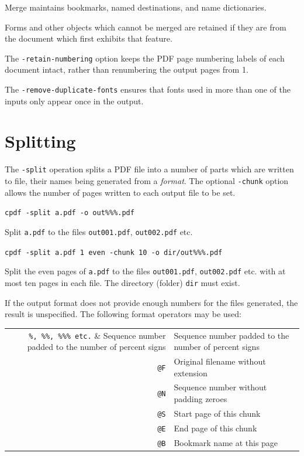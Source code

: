 \documentclass[a4paper,makeidx]{memoir}
\begin{document}
\noindent Merge maintains bookmarks, named destinations, and name dictionaries.

Forms and other objects which cannot be merged are retained if they are from
the document which first exhibits that feature.

The \texttt{-retain-numbering} option keeps the PDF page numbering labels of
each document intact, rather than renumbering the output pages from 1.

The \texttt{-remove-duplicate-fonts} ensures that fonts used in more than one
of the inputs only appear once in the output.

  \section{Splitting}
   The \texttt{-split} operation splits a PDF file into a number of parts which
are written to file, their names being generated from a \emph{format}. The
optional \texttt{-chunk} option allows the number of pages written to each
output file to be set. 
  \begin{framed}\small
    \verb!cpdf -split a.pdf -o out%%%.pdf!

    \vspace{2.5mm}
    \noindent Split \texttt{a.pdf} to the files \texttt{out001.pdf}, \texttt{out002.pdf} etc.

    \vspace{2.5mm}
    \verb!cpdf -split a.pdf 1 even -chunk 10 -o dir/out%%%.pdf!

    \vspace{2.5mm}
    \noindent Split the even pages of \texttt{a.pdf} to the files
\texttt{out001.pdf}, \texttt{out002.pdf} etc. with at most ten pages in each
file. The directory (folder) \texttt{dir} must exist.
  \end{framed}
\noindent If the output format does not provide enough numbers for the files generated,
the result is unspecified. The following format operators may be used:

\begin{table}[h]
\centering
\begin{tabular}{rl}
  \verb!%, %%, %%% etc.! & Sequence number padded to the number of percent signs\\
  \texttt{@F} & Original filename without extension \\
  \texttt{@N} & Sequence number without padding zeroes \\
  \texttt{@S} & Start page of this chunk \\
  \texttt{@E} & End page of this chunk \\
  \texttt{@B} & Bookmark name at this page \\
\end{tabular}
\end{table}
\end{document}
